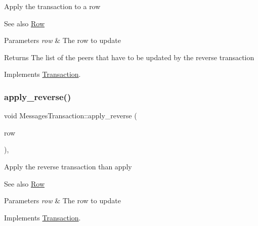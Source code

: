 Apply the transaction to a row \begin{DoxySeeAlso}{See also}
\mbox{\hyperlink{classRow}{Row}}
\end{DoxySeeAlso}

\begin{DoxyParams}{Parameters}
{\em row} & The row to update \\
\hline
\end{DoxyParams}
\begin{DoxyReturn}{Returns}
The list of the peers that have to be updated by the reverse transaction 
\end{DoxyReturn}


Implements \mbox{\hyperlink{classTransaction_a6ea269280c8cc641878f6e5775f270ca}{Transaction}}.

\mbox{\label{classMessagesTransaction_ad44d1a3d26383c153360d3836606b7ce}} 
\subsubsection{\texorpdfstring{apply\+\_\+reverse()}{apply\_reverse()}}
{\footnotesize\ttfamily void Messages\+Transaction\+::apply\+\_\+reverse (\begin{DoxyParamCaption}\item[{\mbox{\hyperlink{classRow}{Row}} $\ast$}]{row }\end{DoxyParamCaption})\hspace{0.3cm}{\ttfamily [override]}, {\ttfamily [virtual]}}

Apply the reverse transaction than apply \begin{DoxySeeAlso}{See also}
\mbox{\hyperlink{classRow}{Row}}
\end{DoxySeeAlso}

\begin{DoxyParams}{Parameters}
{\em row} & The row to update \\
\hline
\end{DoxyParams}


Implements \mbox{\hyperlink{classTransaction_a1ef3b245f37c217f50f8f76fceebca4a}{Transaction}}.

\mbox{\label{classMessagesTransaction_a290e38ea445bba3f62956c660607c03f}} 
